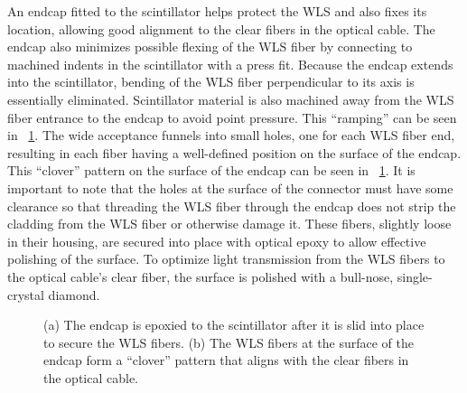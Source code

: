 An endcap fitted to the scintillator helps protect the WLS and also fixes its location, allowing good alignment to the clear fibers in the optical cable.  The endcap also minimizes possible flexing of the WLS fiber by connecting to machined indents in the scintillator with a press fit.  Because the endcap extends into the scintillator, bending of the WLS fiber perpendicular to its axis is essentially eliminated.  Scintillator material is also machined away from the WLS fiber entrance to the endcap to avoid point pressure.  This ``ramping'' can be seen in {\fig}~\ref{fig:paddleAssembly}.  The wide acceptance funnels into small holes, one for each WLS fiber end, resulting in each fiber having a well-defined position on the surface of the endcap.  This ``clover'' pattern on the surface of the endcap can be seen in {\fig}~\ref{fig:paddleAssembly}.  It is important to note that the holes at the surface of the connector must have some clearance so that threading the WLS fiber through the endcap does not strip the cladding from the WLS fiber or otherwise damage it.  These fibers, slightly loose in their housing, are secured into place with optical epoxy to allow effective polishing of the surface.  To optimize light transmission from the WLS fibers to the optical cable's clear fiber, the surface is polished with a bull-nose, single-crystal diamond.  
\begin{figure}[!htbp]
\centering
{}
\caption[A view of the endcap used to terminate the WLS fiber.]{(a) The endcap is epoxied to the scintillator after it is slid into place to secure the WLS fibers.  (b) The WLS fibers at the surface of the endcap form a ``clover'' pattern that aligns with the clear fibers in the optical cable.}
\label{fig:paddleAssembly}
\end{figure}

